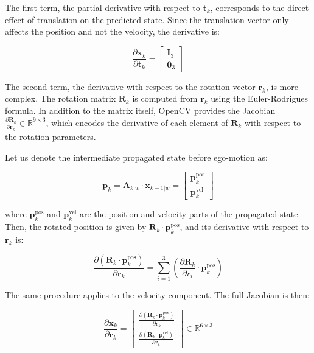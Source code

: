 The first term, the partial derivative with respect to $\mathbf{t}_k$, corresponds to the direct effect of 
translation on the predicted state. Since the translation vector only affects the position and not the 
velocity, the derivative is:

\begin{equation}
  \frac{\partial \mathbf{x}_{k}}{\partial \mathbf{t}_k} =
  \begin{bmatrix}
    \mathbf{I}_3 \\
    \mathbf{0}_3
  \end{bmatrix}
\end{equation}

The second term, the derivative with respect to the rotation vector $\mathbf{r}_k$, is more complex.
The rotation matrix $\mathbf{R}_k$ is computed from $\mathbf{r}_k$ using the Euler-Rodrigues formula.
In addition to the matrix itself, OpenCV provides the Jacobian 
$\frac{\partial \mathbf{R}_k}{\partial \mathbf{r}_k} \in \mathbb{R}^{9 \times 3}$, which encodes the derivative
of each element of $\mathbf{R}_k$ with respect to the rotation parameters.

Let us denote the intermediate propagated state before ego-motion as:

\begin{equation}
  \mathbf{p}_k = \mathbf{A}_{k|w} \cdot \mathbf{x}_{k-1|w} =
  \begin{bmatrix}
    \mathbf{p}^{\text{pos}}_k \\
    \mathbf{p}^{\text{vel}}_k
  \end{bmatrix}
\end{equation}

where $\mathbf{p}^{\text{pos}}_k$ and $\mathbf{p}^{\text{vel}}_k$ are the position and velocity parts of the
propagated state. Then, the rotated position is given by 
$\mathbf{R}_k \cdot \mathbf{p}^{\text{pos}}_k$, and its derivative with respect to $\mathbf{r}_k$ is:

\begin{equation}
  \frac{\partial (\mathbf{R}_k \cdot \mathbf{p}^{\text{pos}}_k)}{\partial \mathbf{r}_k} = 
  \sum_{i=1}^3 \left( \frac{\partial \mathbf{R}_k}{\partial r_i} \cdot \mathbf{p}^{\text{pos}}_k \right)
\end{equation}

The same procedure applies to the velocity component. The full Jacobian is then:

\begin{equation}
  \frac{\partial \mathbf{x}_{k}}{\partial \mathbf{r}_k} =
  \begin{bmatrix}
    \frac{\partial (\mathbf{R}_k \cdot \mathbf{p}^{\text{pos}}_k)}{\partial \mathbf{r}_k} \\
    \frac{\partial (\mathbf{R}_k \cdot \mathbf{p}^{\text{vel}}_k)}{\partial \mathbf{r}_k}
  \end{bmatrix}
  \in \mathbb{R}^{6 \times 3}
\end{equation}

